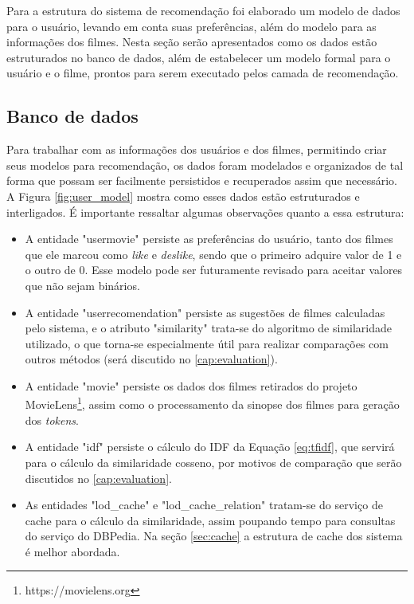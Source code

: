 Para a estrutura do sistema de recomendação foi elaborado um modelo de dados para o usuário, levando em conta suas preferências, além do modelo para as informações dos filmes. Nesta seção serão apresentados como os dados estão estruturados no banco de dados, além de estabelecer um modelo formal para o usuário e o filme, prontos para serem executado pelos camada de recomendação.

\subsection{Banco de dados}

Para trabalhar com as informações dos usuários e dos filmes, permitindo criar seus modelos para recomendação, os dados foram modelados e organizados de tal forma que possam ser facilmente persistidos e recuperados assim que necessário. A Figura \ref{fig:user_model} mostra como esses dados estão estruturados e interligados. É importante ressaltar algumas observações quanto a essa estrutura:

\begin{itemize}
	\item{A entidade "user\textunderscore movie" persiste as preferências do usuário, tanto dos filmes que ele marcou como \textit{like} e \textit{deslike}, sendo que o primeiro adquire valor de 1 e o outro de 0. Esse modelo pode ser futuramente revisado para aceitar valores que não sejam binários.}
	
	\item{A entidade "user\textunderscore recomendation" persiste as sugestões de filmes calculadas pelo sistema, e o atributo "similarity" trata-se do algoritmo de similaridade utilizado, o que torna-se especialmente útil para realizar comparações com outros métodos (será discutido no \ref{cap:evaluation}).}
	
	\item{A entidade "movie" persiste os dados dos filmes retirados do projeto MovieLens\footnote{https://movielens.org}, assim como o processamento da sinopse dos filmes para geração dos \textit{tokens}.}
	
	\item{A entidade "idf" persiste o cálculo do \ac{IDF} da Equação \ref{eq:tfidf}, que servirá para o cálculo da similaridade cosseno, por motivos de comparação que serão discutidos no \ref{cap:evaluation}.}
	
	\item{As entidades "lod\_cache" e "lod\_cache\_relation" tratam-se do serviço de cache para o cálculo da similaridade, assim poupando tempo para consultas do serviço do DBPedia. Na seção \ref{sec:cache} a estrutura de cache dos sistema é melhor abordada.}
\end{itemize}


